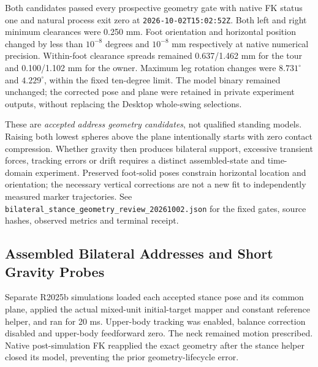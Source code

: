 \documentclass[11pt,a4paper]{article}
\begin{document}
Both candidates passed every prospective geometry gate with native FK
status one and natural process exit zero at
\texttt{2026-10-02T15:02:52Z}. Both left and right minimum clearances
were 0.250 mm. Foot orientation and horizontal position changed by less
than $10^{-8}$ degrees and $10^{-8}$ mm respectively at native numerical
precision. Within-foot clearance spreads remained 0.637/1.462 mm for the
tour and 0.100/1.102 mm for the owner. Maximum leg rotation changes were
$8.731^\circ$ and $4.229^\circ$, within the fixed ten-degree limit.
The model binary remained unchanged; the corrected pose and plane were
retained in private experiment outputs, without replacing the Desktop
whole-swing selections.

These are \emph{accepted address geometry candidates}, not qualified
standing models. Raising both lowest spheres above the plane intentionally
starts with zero contact compression. Whether gravity then produces
bilateral support, excessive transient forces, tracking errors or drift
requires a distinct assembled-state and time-domain experiment. Preserved
foot-solid poses constrain horizontal location and orientation; the
necessary vertical corrections are not a new fit to independently measured
marker trajectories. See
\texttt{bilateral\_stance\_geometry\_review\_20261002.json} for the
fixed gates, source hashes, observed metrics and terminal receipt.

\subsection{Assembled Bilateral Addresses and Short Gravity Probes}
Separate R2025b simulations loaded each accepted stance pose and its common
plane, applied the actual mixed-unit initial-target mapper and constant
reference helper, and ran for 20 ms. Upper-body tracking was enabled,
balance correction disabled and upper-body feedforward zero. The neck
remained motion prescribed. Native post-simulation FK reapplied the exact
geometry after the stance helper closed its model, preventing the prior
geometry-lifecycle error.
\end{document}
